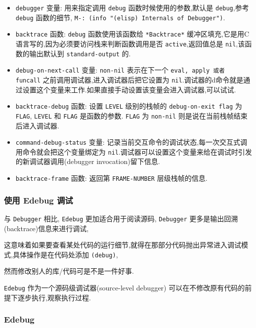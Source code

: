 \documentclass[11pt]{article}
\begin{document}
\begin{enumerate}
\begin{itemize}
\item \texttt{debugger} 变量: 用来指定调用 \texttt{debug} 函数时候使用的参数,默认是 \texttt{debug},参考 \texttt{debug} 函数的细节, \texttt{M-: (info "(elisp) Internals of Debugger")}.
\item \texttt{backtrace} 函数: \texttt{debug} 函数使用该函数给 \texttt{*Backtrace*} 缓冲区填充,它是用C语言写的,因为必须要访问栈来判断函数调用是否 \texttt{active},返回值总是 \texttt{nil},该函数的输出默认到 \texttt{standard-output} 的.
\item \texttt{debug-on-next-call} 变量: \texttt{non-nil} 表示在下一个 \texttt{eval, apply 或者 funcall} 之前调用调试器,进入调试器后把它设置为 \texttt{nil}.调试器的d命令就是通过设置这个变量来工作.如果直接手动设置该变量会进入调试器,可以试试.
\item \texttt{backtrace-debug} 函数: 设置 \texttt{LEVEL} 级别的栈帧的 \texttt{debug-on-exit flag} 为 \texttt{FLAG}, \texttt{LEVEL} 和 \texttt{FLAG} 是函数的参数. \texttt{FLAG} 为 \texttt{non-nil} 则是说在当前栈帧结束后进入调试器.
\item \texttt{command-debug-status} 变量: 记录当前交互命令的调试状态,每一次交互式调用命令就会把这个变量绑定为 \texttt{nil}.调试器可以设置这个变量来给在调试时引发的新调试器调用(debugger invocation)留下信息.
\item \texttt{backtrace-frame} 函数: 返回第 \texttt{FRAME-NUMBER} 层级栈帧的信息.
\end{itemize}
\end{enumerate}


\subsubsection{使用 Edebug 调试}
\label{sec:org84e4b30}

与 \texttt{Debugger} 相比, \texttt{Edebug} 更加适合用于阅读源码, \texttt{Debugger} 更多是输出回溯(backtrace)信息来进行调试,

这意味着如果要查看某处代码的运行细节,就得在那部分代码抛出异常进入调试模式,具体操作是在代码处添加 \texttt{(debug)},

然而修改别人的库/代码可是不是一件好事.

\texttt{Edebug} 作为一个源码级调试器(source-level debugger) 可以在不修改原有代码的前提下逐步执行,观察执行过程.

\subsubsection{Edebug}
\label{sec:orgca6b6f8}
\end{document}
